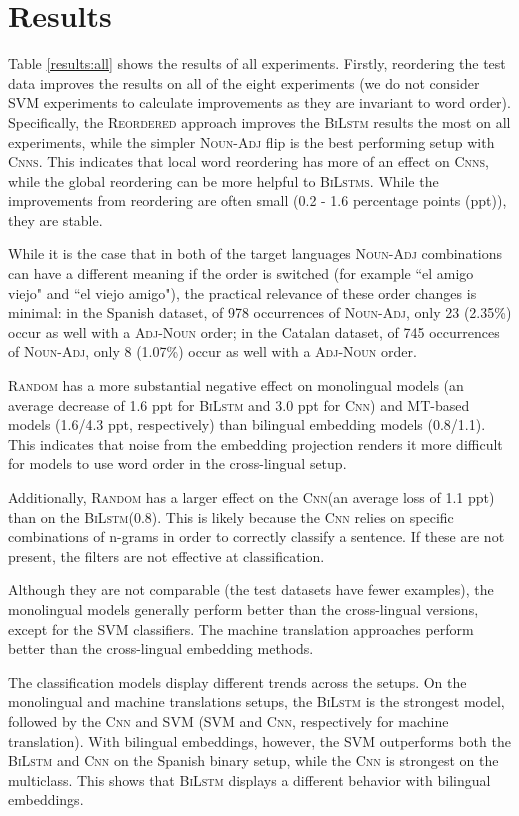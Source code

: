 \documentclass[a4paper,11pt,twocolumn,twoside]{article}
\newcommand{\mtreordered}{\textsc{Reordered}\xspace}
\newcommand{\nadj}{\textsc{Noun-Adj}\xspace}
\newcommand{\adjn}{\textsc{Adj-Noun}\xspace}
\newcommand{\random}{\textsc{Random}\xspace}
\newcommand{\bilstm}{\textsc{BiLstm}\xspace}
\newcommand{\cnn}{\textsc{Cnn}\xspace}
\newcommand{\bilstms}{\textsc{BiLstms}\xspace}
\newcommand{\cnns}{\textsc{Cnns}\xspace}
\begin{document}
\section{Results}


Table \ref{results:all} shows the results of all experiments. Firstly, reordering the test data improves the results on all of the eight experiments (we do not consider SVM experiments to calculate improvements as they are invariant to word order). Specifically, the \mtreordered approach improves the \bilstm results the most on all experiments, while the simpler \nadj flip is the best performing setup with \cnns. This indicates that local word reordering has more of an effect on \cnns, while the global reordering can be more helpful to \bilstms. While the improvements from reordering are often small (0.2 - 1.6 percentage points (ppt)), they are stable. 

While it is the case that in both of the target languages \nadj combinations can have a different meaning if the order is switched (for example ``el amigo viejo" and ``el viejo amigo"), the practical relevance of these order changes is minimal: in the Spanish dataset, of 978 occurrences of \nadj, only 23 (2.35\%) occur as well with a \adjn order; in the Catalan dataset, of 745 occurrences of \nadj, only 8 (1.07\%) occur as well with a \adjn order.

\random has a more substantial negative effect on monolingual models (an average decrease of 1.6 ppt for \bilstm and 3.0 ppt for \cnn) and MT-based models (1.6/4.3 ppt, respectively) than bilingual embedding models (0.8/1.1). This indicates that noise from the embedding projection renders it more difficult for models to use word order in the cross-lingual setup.

Additionally, \random has a larger effect on the \cnn (an average loss of 1.1 ppt) than on the \bilstm (0.8). This is likely because the \cnn relies on specific combinations of n-grams in order to correctly classify a sentence. If these are not present, the filters are not effective at classification.

Although they are not comparable (the test datasets have fewer examples), the monolingual models generally perform better than the cross-lingual versions, except for the SVM classifiers. The machine translation approaches perform better than the cross-lingual embedding methods.

The classification models display different trends across the setups. On the monolingual and machine translations setups, the \bilstm is the strongest model, followed by the \cnn and SVM (SVM and \cnn, respectively for machine translation). With bilingual embeddings, however, the SVM outperforms both the \bilstm and \cnn on the Spanish binary setup, while the \cnn is strongest on the multiclass.  This shows that \bilstm displays a different behavior with bilingual embeddings.
\end{document}
